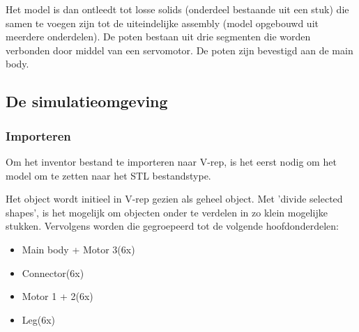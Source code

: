 \documentclass[10pt,a4paper]{article}
\begin{document}
Het model is dan ontleedt tot losse solids (onderdeel bestaande uit een stuk) die samen te voegen zijn tot de uiteindelijke assembly (model opgebouwd uit meerdere onderdelen). De poten bestaan uit drie segmenten die worden verbonden door middel van een servomotor. De poten zijn bevestigd aan de main body. \\



\subsection{De simulatieomgeving}
\subsubsection{Importeren}
Om het inventor bestand te importeren naar V-rep, is het eerst nodig om het model om te zetten naar het STL bestandstype.

Het object wordt initieel in V-rep gezien als geheel object. Met 'divide selected shapes', is het mogelijk om objecten onder te verdelen in zo klein mogelijke stukken. Vervolgens worden die gegroepeerd tot de volgende hoofdonderdelen:

\begin{itemize}
\item Main body + Motor 3(6x)
\item Connector(6x)
\item Motor 1 + 2(6x)
\item Leg(6x)
\end{itemize}
\end{document}
